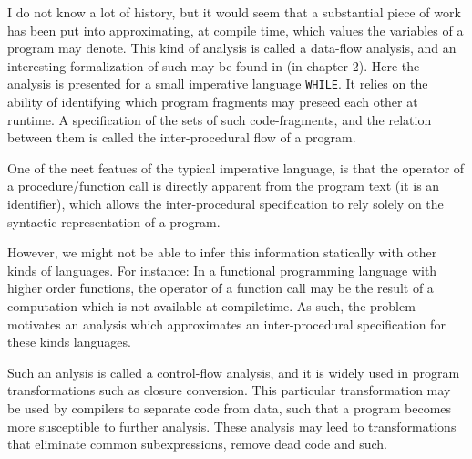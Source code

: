 
I do not know a lot of history, but it would seem that a substantial piece
of work has been put into approximating, at compile time,
which values the variables of a program may denote.
This kind of analysis is called a data-flow analysis,
and an interesting formalization of such may be found in \cite{Nielson} (in chapter 2).
Here the analysis is presented for a small imperative language {\tt WHILE}.
It relies on the ability of identifying which program fragments may
preseed each other at runtime.
A specification of the sets of such code-fragments,
and the relation between them is called the inter-procedural flow of a program.

One of the neet featues of the typical imperative language, is that
the operator of a procedure/function call is directly apparent
from the program text (it is an identifier),
which allows the inter-procedural specification
to rely solely on the syntactic representation of a program.

However, we might not be able to infer this information statically with
other kinds of languages.
For instance: In a functional programming language with higher order functions,
the operator of a function call may be the result of a computation
which is not available at compiletime\cite{cfa-jan}.
As such, the problem motivates an analysis which approximates an inter-procedural
specification for these kinds languages.

Such an anlysis is called a control-flow analysis\cite{Nielson},
and it is widely used in program transformations such
as closure conversion.
This particular transformation may be used by compilers to separate code from data,
such that a program becomes more susceptible to further analysis.
These analysis may leed to transformations that eliminate common subexpressions,
remove dead code and such\cite{ClosureConversion}.







